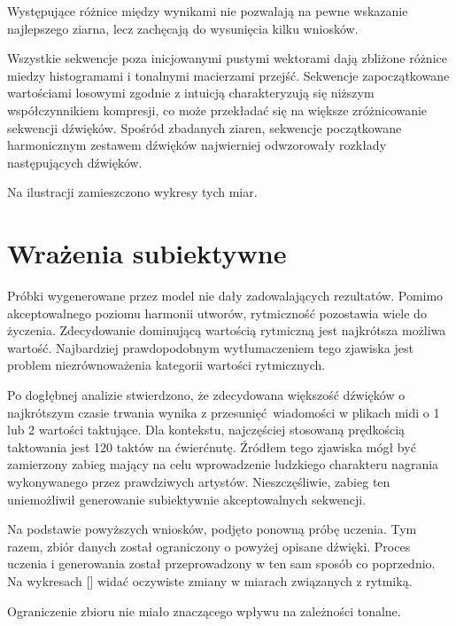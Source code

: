 {{        Występujące różnice między wynikami nie pozwalają na pewne wskazanie najlepszego ziarna, lecz 
        zachęcają do wysunięcia kilku wniosków.

        Wszystkie sekwencje poza inicjowanymi pustymi wektorami dają zbliżone różnice miedzy histogramami i 
        tonalnymi macierzami przejść. 
        Sekwencje zapoczątkowane wartościami losowymi zgodnie z intuicją charakteryzują się niższym współczynnikiem
        kompresji, co może przekładać się na większe zróżnicowanie sekwencji dźwięków.
        Spośród zbadanych ziaren, sekwencje początkowane harmonicznym zestawem dźwięków najwierniej
        odwzorowały rozkłady następujących dźwięków.
        
        Na ilustracji zamieszczono wykresy tych miar.

    }

    \section{Wrażenia subiektywne}
    {
        Próbki wygenerowane przez model nie dały zadowalających rezultatów. Pomimo akceptowalnego poziomu 
        harmonii utworów, rytmiczność pozostawia wiele do życzenia. Zdecydowanie dominującą wartością 
        rytmiczną jest najkrótsza możliwa wartość. Najbardziej prawdopodobnym wytłumaczeniem tego zjawiska jest 
        problem niezrównoważenia kategorii wartości rytmicznych. 

        Po dogłębnej analizie stwierdzono, że zdecydowana większość dźwięków o najkrótszym czasie trwania
        wynika z przesunięć wiadomości w plikach midi o 1 lub 2 wartości taktujące. Dla kontekstu, najczęściej stosowaną
        prędkością taktowania jest 120 taktów na ćwierćnutę. Źródłem tego zjawiska mógł być zamierzony 
        zabieg mający na celu wprowadzenie ludzkiego charakteru nagrania wykonywanego przez
        prawdziwych artystów.
        Nieszczęśliwie, zabieg ten uniemożliwił generowanie subiektywnie akceptowalnych sekwencji.

        Na podstawie powyższych wniosków, podjęto ponowną próbę uczenia. Tym razem, zbiór danych został
        ograniczony o powyżej opisane dźwięki. Proces uczenia i generowania został przeprowadzony w ten sam sposób
        co poprzednio. Na wykresach [] widać oczywiste zmiany w miarach związanych z rytmiką.


        Ograniczenie zbioru nie miało znaczącego wpływu na zależności tonalne.

}}
